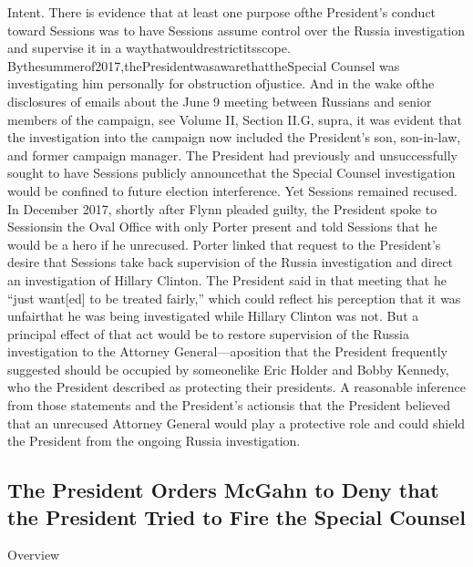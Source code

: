 Intent. There is evidence that at least one purpose ofthe President’s conduct toward Sessions was to have Sessions assume control over the Russia investigation and supervise it in a waythatwouldrestrictitsscope. Bythesummerof2017,thePresidentwasawarethattheSpecial Counsel was investigating him personally for obstruction ofjustice. And in the wake ofthe disclosures of emails about the June 9 meeting between Russians and senior members of the campaign, see Volume II, Section II.G, supra, it was evident that the investigation into the campaign now included the President’s son, son-in-law, and former campaign manager. The President had previously and unsuccessfully sought to have Sessions publicly announcethat the Special Counsel investigation would be confined to future election interference. Yet Sessions remained recused. In December 2017, shortly after Flynn pleaded guilty, the President spoke to Sessionsin the Oval Office with only Porter present and told Sessions that he would be a hero if he unrecused. Porter linked that request to the President’s desire that Sessions take back supervision of the Russia investigation and direct an investigation of Hillary Clinton. The President said in that meeting that he “just want[ed] to be treated fairly,” which could reflect his perception that it was unfairthat he was being investigated while Hillary Clinton was not. But a principal effect of that act would be to restore supervision of the Russia investigation to the
Attorney General—aposition that the President frequently suggested should be occupied by someonelike Eric Holder and Bobby Kennedy, who the President described as protecting their presidents. A reasonable inference from those statements and the President’s actionsis that the President believed that an unrecused Attorney General would play a protective role and could shield the President from the ongoing Russia investigation.

\subsection{The President Orders McGahn to Deny that the President Tried to Fire the Special Counsel}

Overview

